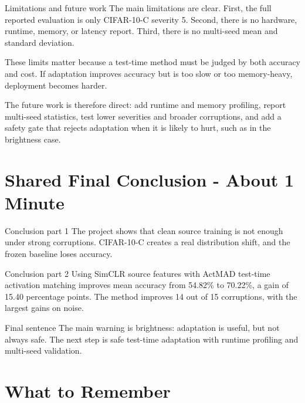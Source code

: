 \documentclass[11pt,a4paper]{article}
\begin{document}
\begin{rayanebox}{Limitations and future work}
The main limitations are clear. First, the full reported evaluation is only CIFAR-10-C severity 5. Second, there is no hardware, runtime, memory, or latency report. Third, there is no multi-seed mean and standard deviation.

These limits matter because a test-time method must be judged by both accuracy and cost. If adaptation improves accuracy but is too slow or too memory-heavy, deployment becomes harder.

The future work is therefore direct: add runtime and memory profiling, report multi-seed statistics, test lower severities and broader corruptions, and add a safety gate that rejects adaptation when it is likely to hurt, such as in the brightness case.
\end{rayanebox}

\section{Shared Final Conclusion - About 1 Minute}

\begin{sorooshbox}{Conclusion part 1}
The project shows that clean source training is not enough under strong corruptions. CIFAR-10-C creates a real distribution shift, and the frozen baseline loses accuracy.
\end{sorooshbox}

\begin{rayanebox}{Conclusion part 2}
Using SimCLR source features with ActMAD test-time activation matching improves mean accuracy from 54.82\% to 70.22\%, a gain of 15.40 percentage points. The method improves 14 out of 15 corruptions, with the largest gains on noise.
\end{rayanebox}

\begin{sorooshbox}{Final sentence}
The main warning is brightness: adaptation is useful, but not always safe. The next step is safe test-time adaptation with runtime profiling and multi-seed validation.
\end{sorooshbox}

\section{What to Remember}
\end{document}
